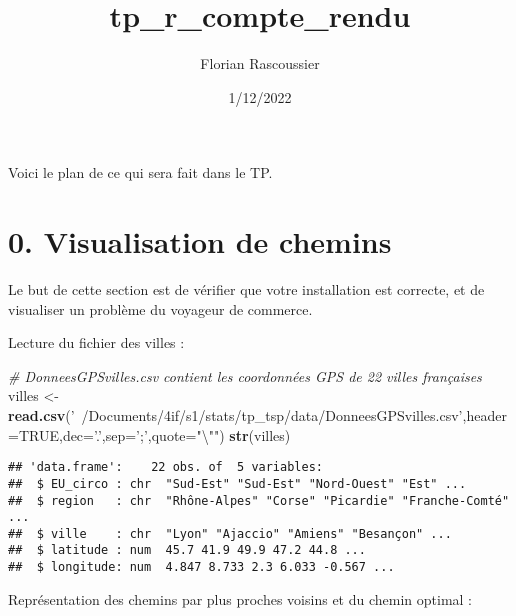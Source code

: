 \documentclass[
]{article}
\title{tp\_r\_compte\_rendu}
\author{Florian Rascoussier}
\date{1/12/2022}
\newenvironment{Shaded}{\begin{snugshade}}{\end{snugshade}}
\newcommand{\CharTok}[1]{\textcolor[rgb]{0.31,0.60,0.02}{#1}}
\newcommand{\CommentTok}[1]{\textcolor[rgb]{0.56,0.35,0.01}{\textit{#1}}}
\newcommand{\DataTypeTok}[1]{\textcolor[rgb]{0.13,0.29,0.53}{#1}}
\newcommand{\KeywordTok}[1]{\textcolor[rgb]{0.13,0.29,0.53}{\textbf{#1}}}
\newcommand{\NormalTok}[1]{#1}
\newcommand{\OtherTok}[1]{\textcolor[rgb]{0.56,0.35,0.01}{#1}}
\newcommand{\StringTok}[1]{\textcolor[rgb]{0.31,0.60,0.02}{#1}}
\begin{document}
\maketitle

Voici le plan de ce qui sera fait dans le TP.

\hypertarget{visualisation-de-chemins}{%
\section{0. Visualisation de chemins}\label{visualisation-de-chemins}}

Le but de cette section est de vérifier que votre installation est
correcte, et de visualiser un problème du voyageur de commerce.

Lecture du fichier des villes :

\begin{Shaded}
\begin{Highlighting}[]
\CommentTok{# DonneesGPSvilles.csv contient les coordonnées GPS de 22 villes françaises}
\NormalTok{villes <-}\StringTok{ }\KeywordTok{read.csv}\NormalTok{(}\StringTok{'~/Documents/4if/s1/stats/tp_tsp/data/DonneesGPSvilles.csv'}\NormalTok{,}\DataTypeTok{header=}\OtherTok{TRUE}\NormalTok{,}\DataTypeTok{dec=}\StringTok{'.'}\NormalTok{,}\DataTypeTok{sep=}\StringTok{';'}\NormalTok{,}\DataTypeTok{quote=}\StringTok{"}\CharTok{\textbackslash{}"}\StringTok{"}\NormalTok{)}
\KeywordTok{str}\NormalTok{(villes)}
\end{Highlighting}
\end{Shaded}

\begin{verbatim}
## 'data.frame':    22 obs. of  5 variables:
##  $ EU_circo : chr  "Sud-Est" "Sud-Est" "Nord-Ouest" "Est" ...
##  $ region   : chr  "Rhône-Alpes" "Corse" "Picardie" "Franche-Comté" ...
##  $ ville    : chr  "Lyon" "Ajaccio" "Amiens" "Besançon" ...
##  $ latitude : num  45.7 41.9 49.9 47.2 44.8 ...
##  $ longitude: num  4.847 8.733 2.3 6.033 -0.567 ...
\end{verbatim}

Représentation des chemins par plus proches voisins et du chemin optimal
:
\end{document}
